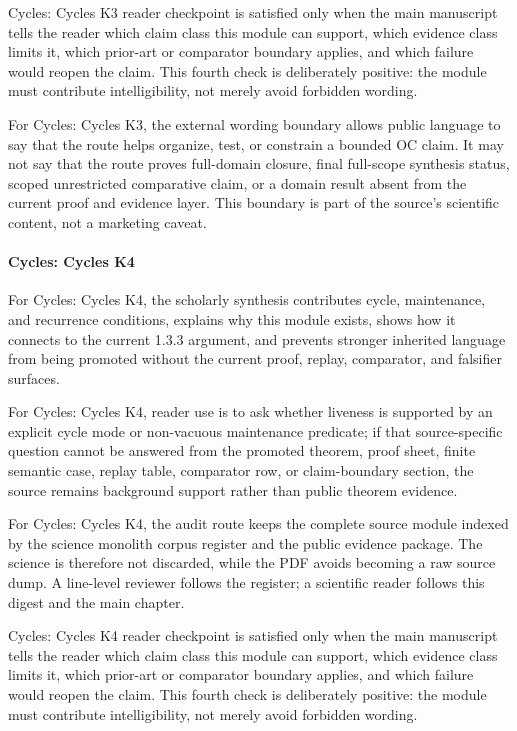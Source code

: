 Cycles: Cycles K3 reader checkpoint is satisfied only when the main manuscript tells the reader which claim class this module can support, which evidence class limits it, which prior-art or comparator boundary applies, and which failure would reopen the claim. This fourth check is deliberately positive: the module must contribute intelligibility, not merely avoid forbidden wording.


For Cycles: Cycles K3, the external wording boundary allows public language to say that the route helps organize, test, or constrain a bounded OC claim. It may not say that the route proves full-domain closure, final full-scope synthesis status, scoped unrestricted comparative claim, or a domain result absent from the current proof and evidence layer. This boundary is part of the source's scientific content, not a marketing caveat.


\paragraph{Cycles: Cycles K4}

For Cycles: Cycles K4, the scholarly synthesis contributes cycle, maintenance, and recurrence conditions, explains why this module exists, shows how it connects to the current 1.3.3 argument, and prevents stronger inherited language from being promoted without the current proof, replay, comparator, and falsifier surfaces.


For Cycles: Cycles K4, reader use is to ask whether liveness is supported by an explicit cycle mode or non-vacuous maintenance predicate; if that source-specific question cannot be answered from the promoted theorem, proof sheet, finite semantic case, replay table, comparator row, or claim-boundary section, the source remains background support rather than public theorem evidence.


For Cycles: Cycles K4, the audit route keeps the complete source module indexed by the science monolith corpus register and the public evidence package. The science is therefore not discarded, while the PDF avoids becoming a raw source dump. A line-level reviewer follows the register; a scientific reader follows this digest and the main chapter.


Cycles: Cycles K4 reader checkpoint is satisfied only when the main manuscript tells the reader which claim class this module can support, which evidence class limits it, which prior-art or comparator boundary applies, and which failure would reopen the claim. This fourth check is deliberately positive: the module must contribute intelligibility, not merely avoid forbidden wording.


